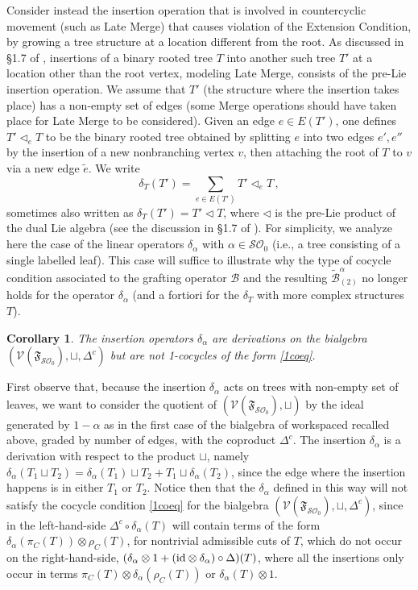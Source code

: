 \documentclass[12pt]{amsart}
\newtheorem{cor}[thm]{Corollary}
\numberwithin{equation}{section}
\def\cB{{\mathcal B}}
\def\cO{{\mathcal O}}
\def\cS{{\mathcal S}}
\def\cV{{\mathcal V}}
\def\fF{{\mathfrak F}}
\begin{document}
Consider instead the insertion operation that is involved in countercyclic movement
(such as Late Merge) that causes violation of the Extension Condition, by growing
a tree structure at a location different from the root. As discussed in \S 1.7 of \cite{MCB},
insertions of a binary rooted tree $T$ into another such tree $T'$ at a location other than
the root vertex, modeling Late Merge, consists of the pre-Lie insertion operation. 
We assume that $T'$ (the structure where the insertion takes place) has a non-empty set
of edges (some Merge operations should have taken place for Late Merge to be
considered). Given an edge $e \in E(T')$, one defines $T' \lhd_e T$ to be the binary
rooted tree obtained by splitting $e$ into two edges $e', e''$ by the insertion of a new
nonbranching vertex $v$, then attaching the root of $T$ to $v$ via a new edge $\tilde e$.
We write
$$ \delta_T (T')=\sum_{e\in E(T')} T' \lhd_e T \, , $$
sometimes also written as $\delta_T(T')=T' \lhd T$, where $\lhd$ is the pre-Lie
product of the dual Lie algebra (see the discussion in  \S 1.7 of \cite{MCB}). 
For simplicity, we analyze here the case of the linear operators $\delta_\alpha$
with $\alpha \in \cS\cO_0$ (i.e., a tree consisting of a single labelled leaf). This
case will suffice to illustrate why the type of cocycle condition associated to
the grafting operator $\cB$ and the resulting $\tilde\cB^\alpha_{(2)}$ no longer
holds for the operator $\delta_\alpha$ (and a fortiori for the $\delta_T$ with
more complex structures $T$).

\smallskip

\begin{cor}\label{nococins}
The insertion operators $\delta_\alpha$ are derivations on the bialgebra
$(\cV(\fF_{\cS\cO_0}),\sqcup, \Delta^c)$ but are not 1-cocycles of the form \eqref{1coeq}.
\end{cor}

\proof
First observe that, because the insertion $\delta_\alpha$ acts on trees with
non-empty set of leaves, we want to consider the quotient of $(\cV(\fF_{\cS\cO_0}),\sqcup)$
by the ideal generated by $1-\alpha$ as in the first case of the bialgebra of workspaced
recalled above, graded by number of edges, with the coproduct $\Delta^c$. 
The insertion $\delta_\alpha$ is a derivation with respect to the
product $\sqcup$, namely $\delta_\alpha (T_1\sqcup T_2)=\delta_\alpha (T_1)\sqcup T_2+T_1 \sqcup \delta_\alpha (T_2)$,
since the edge where the insertion happens is in either $T_1$ or $T_2$. Notice then that 
the $\delta_\alpha$ defined in this way will not satisfy the cocycle condition \eqref{1coeq} for
the bialgebra $(\cV(\fF_{\cS\cO_0}),\sqcup, \Delta^c)$, since in the left-hand-side
$\Delta^c \circ \delta_\alpha (T)$ will contain terms of the form $\delta_\alpha(\pi_C(T)) \otimes \rho_C(T)$,
for nontrivial admissible cuts of $T$, which do not occur on
the right-hand-side, $(\delta_\alpha\otimes 1+ ({\rm id}\otimes \delta_\alpha)\circ \Delta)(T)$, where
all the insertions only occur in terms $\pi_C(T) \otimes \delta_\alpha(\rho_C(T))$ or $\delta_\alpha(T) \otimes 1$. 
\endproof
\end{document}
